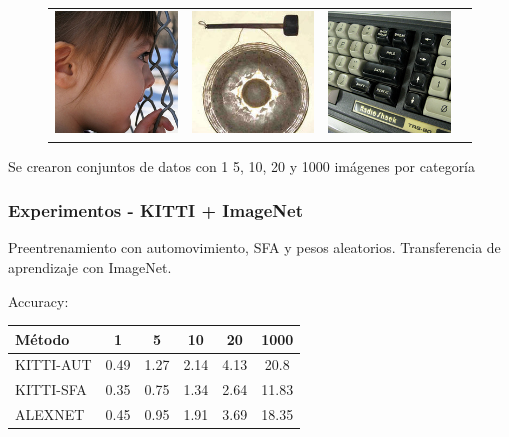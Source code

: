 \documentclass{beamer}
\begin{document}
\begin{frame}[plain]
\begin{figure}
{\begin{tabular}{cccc}
\includegraphics[width = 1.5in]{./images/imagenet/n03000134_789.JPEG} &
\includegraphics[width = 1.5in]{./images/imagenet/n03017168_743.JPEG} &
\includegraphics[width = 1.5in]{./images/imagenet/n03085013_2149.JPEG} \\
\end{tabular}
}
\end{figure}
\vfill
Se crearon conjuntos de datos con 1 5, 10, 20 y 1000 imágenes por categoría
\vfill
\end{frame}





\begin{frame}[plain]
\frametitle{Experimentos - KITTI + ImageNet}

Preentrenamiento con automovimiento, SFA y pesos aleatorios.\pause
\vfill
Transferencia de aprendizaje con ImageNet.\pause
\vfill

Accuracy:
\begin{table}
\centering
\begin{tabular}{l|ccccc}
\hline
\multicolumn{1}{l}{Método}
& \multicolumn{1}{c}{1}
& \multicolumn{1}{c}{5}
& \multicolumn{1}{c}{10}
& \multicolumn{1}{c}{20}
& \multicolumn{1}{c}{1000} \\ \cline{1-6}
\hline

KITTI-AUT & 0.49 & 1.27 & 2.14 & 4.13 & 20.8\\
KITTI-SFA & 0.35 & 0.75 & 1.34 & 2.64 & 11.83\\
ALEXNET & 0.45 & 0.95 & 1.91 & 3.69 & 18.35\\

\hline
\end{tabular}
\end{table}
\end{frame}
\end{document}

